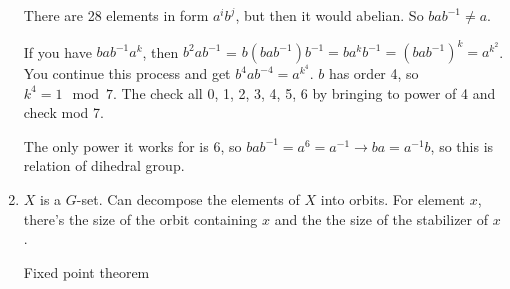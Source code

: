 \documentclass[12pt]{article}
\begin{document}
\begin{enumerate}
        There are 28 elements in form $a^ib^j$, but then it would abelian. So $bab^{-1} \ne a$. 

        If you have $bab^{-1}a^k$, then $b^2ab^{-1}$ = $b(bab^{-1})b^{-1} =
        ba^kb^{-1} = (bab^{-1})^k = a^{k^2}$. You continue this process and get
        $b^4ab^{-4} = a^{k^4}$. $b$ has order 4, so $k^4 = 1 \mod 7$. The check
        all 0, 1, 2, 3, 4, 5, 6 by bringing to power of 4 and check mod 7.

        The only power it works for is 6, so $bab^{-1} = a^6 = a^{-1}
        \rightarrow ba = a^{-1}b$, so this is relation of dihedral group. 
    \item
        $X$ is a $G$-set. Can decompose the elements of $X$ into orbits. For
        element $x$, there's the size of the orbit containing $x$ and the the
        size of the stabilizer of $x$.

        Fixed point theorem
\end{enumerate}
\end{document}
